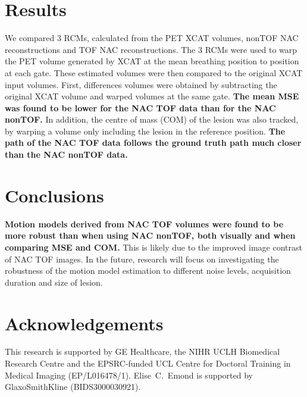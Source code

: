 \documentclass[portrait,color=UCLburgundy,margin=2cm]{uclposter}
\begin{document}
\begin{multicols}{4}
\large

\section*{Results}
We compared $3$ RCMs, calculated from the PET XCAT volumes, nonTOF NAC reconstructions and TOF NAC reconstructions. The $3$ RCMs were used to warp the PET volume generated by XCAT at the mean breathing position to position at each gate. These estimated volumes were then compared to the original XCAT input volumes. First, differences volumes were obtained by subtracting the original XCAT volume and warped volumes at the same gate. \textcolor{UCLburgundy}{\textbf{The mean MSE was found to be lower for the NAC TOF data than for the NAC nonTOF.}} In addition, the centre of mass (COM) of the lesion was also tracked, by warping a volume only including the lesion in the reference position. \textcolor{UCLburgundy}{\textbf{The path of the NAC TOF data follows the ground truth path much closer than the NAC nonTOF data.}}

\section*{Conclusions}
\textcolor{UCLburgundy}{\textbf{Motion models derived from NAC TOF volumes were found to be more robust than when using NAC nonTOF, both visually and when comparing MSE and COM.}} This is likely due to the improved image contrast of NAC TOF images. In the future, research will focus on investigating the robustness of the motion model estimation to different noise levels, acquisition duration and size of lesion.

\AtNextBibliography{\small}
\printbibliography

\small
\section*{Acknowledgements}
This research is supported by GE Healthcare, the NIHR UCLH Biomedical Research Centre and the EPSRC-funded UCL Centre for Doctoral Training in Medical Imaging (EP/L016478/1).
Elise~C.~Emond is supported by GlaxoSmithKline (BIDS3000030921).

\end{multicols}
\end{document}

